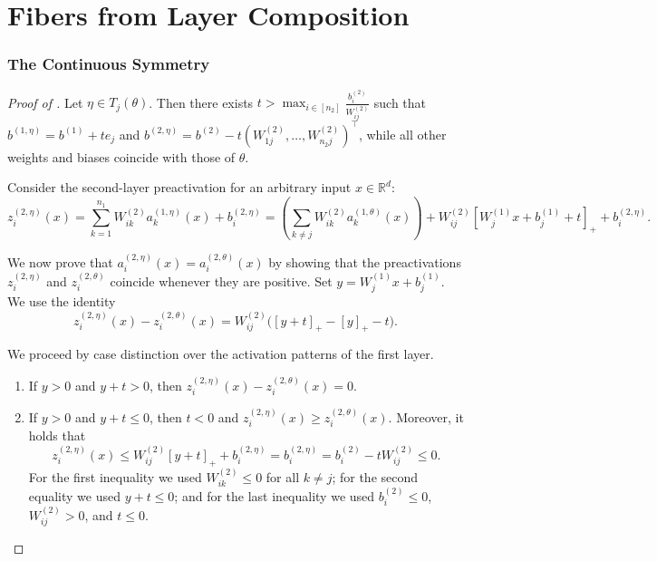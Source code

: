 \documentclass{article}
\theoremstyle{definition}
\newcommand{\R}{\mathbb{R}}
\newcommand{\weights}[1]{W^{(#1)}}
\newcommand{\bias}[1]{b^{(#1)}}
\newcommand{\activation}[1]{a^{(#1)}}
\newcommand{\preactivation}[1]{z^{(#1)}}
\begin{document}
\section{Fibers from Layer Composition} 

\subsubsection*{The Continuous Symmetry}

\lemtranslatinghiddenhyperplaneinclusion*
\begin{proof}[Proof of ]
Let $\eta \in T_j(\theta)$. Then there exists $t > \max_{i \in [n_2]} \frac{\bias{2}_i}{\weights{2}_{ij}}$ 
such that 
\(
\bias{1,\eta} = \bias{1} + t e_j\) 
and 
\(
\bias{2,\eta} = \bias{2} - t (\weights{2}_{1 j}, \dots, \weights{2}_{n_2 j})^\top
\), 
while all other weights and biases coincide with those of $\theta$. 

Consider the second-layer preactivation for an arbitrary input $x \in \R^d$: 
\[
\preactivation{2,\eta}_i(x) = \sum_{k=1}^{n_1} \weights{2}_{ik} \activation{1,\eta}_k(x) + 
\bias{2,\eta}_i
=
\left(\sum_{k \neq j} \weights{2}_{ik} \activation{1,\theta}_k(x)\right) + \weights{2}_{ij}\left[\weights{1}_{j}x + \bias{1}_j + t\right]_+ + \bias{2,\eta}_i .
\]

We now prove that $\activation{2,\eta}_i(x) = \activation{2,\theta}_i(x)$ by showing that the preactivations $\preactivation{2,\eta}_i$ and $\preactivation{2,\theta}_i$ coincide whenever they are positive. 
%
Set $y = \weights{1}_{j}x + \bias{1}_j$. We use the identity
\[
\preactivation{2,\eta}_i(x)-\preactivation{2,\theta}_i(x)
=
\weights{2}_{ij}\big([y+t]_+-[y]_+-t\big).
\]

%
 We proceed by 
 case distinction over the activation patterns of the first layer.  

 \begin{enumerate} 

\item 
If $y>0$ and $y+t>0$, then
$\preactivation{2,\eta}_i(x) - \preactivation{2,\theta}_i(x)=0$. 

\item 
If $y>0$ and $y+t\leq0$, then $t<0$ and $\preactivation{2,\eta}_i(x) \geq \preactivation{2,\theta}_i(x)$. 
%
Moreover, it holds that 
\[
\preactivation{2,\eta}_i(x) \leq \weights{2}_{ij}[y + t]_+ + \bias{2,\eta}_i= \bias{2,\eta}_i 
= 
\bias{2}_i-t
{\weights{2}_{ij}} 
%
\leq 0 .
\] 
For the first inequality we used 
$\weights{2}_{ik}\leq0$ for all $k\neq j$; 
for the second equality we used $y+t\leq0$; 
and for the last inequality we used $\bias{2}_i \leq 0$, $\weights{2}_{ij}>0$, and $t\leq0$. 


\end{enumerate}
\end{proof}
\end{document}
